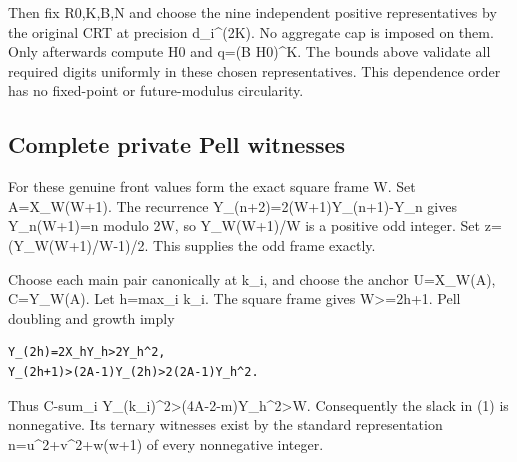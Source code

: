 Then fix R0,K,B,N and choose the nine independent positive representatives by the original CRT at precision d\_\allowbreak{}i\textasciicircum{}\allowbreak{}(2K). No aggregate cap is imposed on them. Only afterwards compute H0 and q=\allowbreak{}(B H0)\textasciicircum{}\allowbreak{}K. The bounds above validate all required digits uniformly in these chosen representatives. This dependence order has no fixed-point or future-modulus circularity.



\subsection{Complete private Pell witnesses}



For these genuine front values form the exact square frame W. Set A=\allowbreak{}X\_\allowbreak{}W(W+\allowbreak{}1). The recurrence Y\_\allowbreak{}(n+\allowbreak{}2)=\allowbreak{}2(W+\allowbreak{}1)Y\_\allowbreak{}(n+\allowbreak{}1)-Y\_\allowbreak{}n gives Y\_\allowbreak{}n(W+\allowbreak{}1)=\allowbreak{}n modulo 2W, so Y\_\allowbreak{}W(W+\allowbreak{}1)/\allowbreak{}W is a positive odd integer. Set z=\allowbreak{}(Y\_\allowbreak{}W(W+\allowbreak{}1)/\allowbreak{}W-1)/\allowbreak{}2. This supplies the odd frame exactly.



Choose each main pair canonically at k\_\allowbreak{}i, and choose the anchor U=\allowbreak{}X\_\allowbreak{}W(A), C=\allowbreak{}Y\_\allowbreak{}W(A). Let h=\allowbreak{}max\_\allowbreak{}i k\_\allowbreak{}i. The square frame gives W\textgreater{}\allowbreak{}=\allowbreak{}2h+\allowbreak{}1. Pell doubling and growth imply



\begin{verbatim}
Y_(2h)=2X_hY_h>2Y_h^2,
Y_(2h+1)>(2A-1)Y_(2h)>2(2A-1)Y_h^2.
\end{verbatim}

Thus C-sum\_\allowbreak{}i Y\_\allowbreak{}(k\_\allowbreak{}i)\textasciicircum{}\allowbreak{}2\textgreater{}\allowbreak{}(4A-2-m)Y\_\allowbreak{}h\textasciicircum{}\allowbreak{}2\textgreater{}\allowbreak{}W. Consequently the slack in (1) is nonnegative. Its ternary witnesses exist by the standard representation n=\allowbreak{}u\textasciicircum{}\allowbreak{}2+\allowbreak{}v\textasciicircum{}\allowbreak{}2+\allowbreak{}w(w+\allowbreak{}1) of every nonnegative integer.



